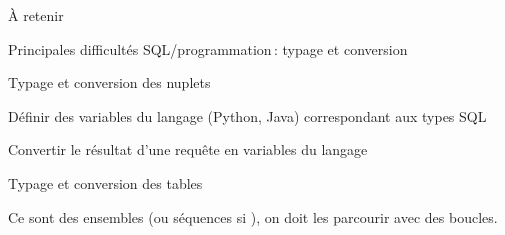 \begin{frame}{À retenir}


Principales difficultés SQL/programmation\,:
\alert{typage} et \alert{conversion}

\vfill

\alert{Typage et conversion des nuplets}

\vfill

\begin{redbullet}
   \item Définir des variables du langage (Python, Java) correspondant aux types
       SQL
   \item Convertir le résultat d'une requête en variables du langage
\end{redbullet}

\vfill

\alert{Typage et conversion des tables}

\vfill

Ce sont des \alert{ensembles} (ou séquences si ), on doit les parcourir avec des \alert{boucles}.

\end{frame}




